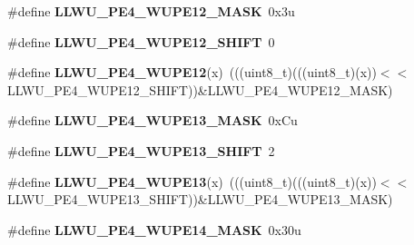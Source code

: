 \begin{DoxyCompactItemize}
\item 
\mbox{\label{group___l_l_w_u___register___masks_ga0d1b6351b58cc9fbf3099dc653754205}} 
\#define {\bfseries L\+L\+W\+U\+\_\+\+P\+E4\+\_\+\+W\+U\+P\+E12\+\_\+\+M\+A\+SK}~0x3u
\item 
\mbox{\label{group___l_l_w_u___register___masks_gaddb0a17347a85705dc2c2975129a7942}} 
\#define {\bfseries L\+L\+W\+U\+\_\+\+P\+E4\+\_\+\+W\+U\+P\+E12\+\_\+\+S\+H\+I\+FT}~0
\item 
\mbox{\label{group___l_l_w_u___register___masks_ga433532e85a0db075b0e525c1483a27ad}} 
\#define {\bfseries L\+L\+W\+U\+\_\+\+P\+E4\+\_\+\+W\+U\+P\+E12}(x)~(((uint8\+\_\+t)(((uint8\+\_\+t)(x))$<$$<$L\+L\+W\+U\+\_\+\+P\+E4\+\_\+\+W\+U\+P\+E12\+\_\+\+S\+H\+I\+FT))\&L\+L\+W\+U\+\_\+\+P\+E4\+\_\+\+W\+U\+P\+E12\+\_\+\+M\+A\+SK)
\item 
\mbox{\label{group___l_l_w_u___register___masks_ga4d9218c37bd27ed586a5e73aa1b20a84}} 
\#define {\bfseries L\+L\+W\+U\+\_\+\+P\+E4\+\_\+\+W\+U\+P\+E13\+\_\+\+M\+A\+SK}~0x\+Cu
\item 
\mbox{\label{group___l_l_w_u___register___masks_ga176680468b0cf75fbccc4a8be5d45388}} 
\#define {\bfseries L\+L\+W\+U\+\_\+\+P\+E4\+\_\+\+W\+U\+P\+E13\+\_\+\+S\+H\+I\+FT}~2
\item 
\mbox{\label{group___l_l_w_u___register___masks_ga0f97d1fbb1fd4c3be4a4641755e8b7a9}} 
\#define {\bfseries L\+L\+W\+U\+\_\+\+P\+E4\+\_\+\+W\+U\+P\+E13}(x)~(((uint8\+\_\+t)(((uint8\+\_\+t)(x))$<$$<$L\+L\+W\+U\+\_\+\+P\+E4\+\_\+\+W\+U\+P\+E13\+\_\+\+S\+H\+I\+FT))\&L\+L\+W\+U\+\_\+\+P\+E4\+\_\+\+W\+U\+P\+E13\+\_\+\+M\+A\+SK)
\item 
\mbox{\label{group___l_l_w_u___register___masks_gae3a1e7b7497f719cfebd559f31dc4d07}} 
\#define {\bfseries L\+L\+W\+U\+\_\+\+P\+E4\+\_\+\+W\+U\+P\+E14\+\_\+\+M\+A\+SK}~0x30u
\item 
\mbox{\label{group___l_l_w_u___register___masks_ga1942d07f99eb5afb836650dcfb2185af}} 

\end{DoxyCompactItemize}
